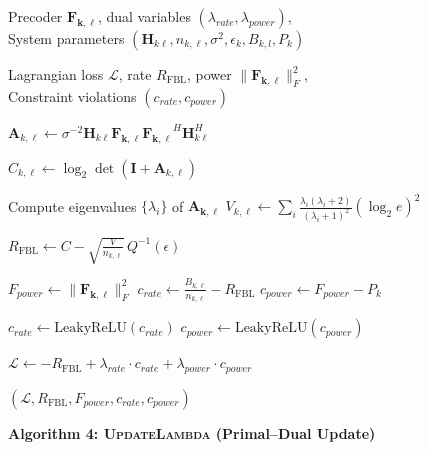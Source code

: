 \documentclass[a4paper, 12pt, onecolumn, journal, twoside, draftclsnofoot]{IEEEtran}
\begin{document}
\begin{algorithmic}[1]

\Require
Precoder $\mathbf{F_{k,\ell}}$, dual variables $(\lambda_{rate}, \lambda_{power})$, \\
System parameters $(\mathbf{H}_{k\ell}, n_{k,\ell}, \sigma^2, \epsilon_k, B_{k,l}, P_k)$

\Ensure
Lagrangian loss $\mathcal{L}$, rate $R_{\mathrm{FBL}}$, power $\|\mathbf{F_{k,\ell}}\|_F^2$, \\
Constraint violations $(c_{rate}, c_{power})$

\State $\mathbf{A}_{k,\ell} \gets \sigma^{-2} \mathbf{H}_{k\ell} \mathbf{F_{k,\ell}} \mathbf{F_{k,\ell}}^H \mathbf{H}_{k\ell}^H$

\Statex {}
\State $C_{k,\ell} \gets \log_2 \det(\mathbf{I} + \mathbf{A}_{k,\ell})$

\Statex {}
\State Compute eigenvalues $\{\lambda_i\}$ of $\mathbf{A_{k,\ell}}$
\State $V_{k,\ell} \gets \sum_i \frac{\lambda_i(\lambda_i + 2)}{(\lambda_i + 1)^2} (\log_2 e)^2$

\Statex {}
\State $R_{\mathrm{FBL}} \gets C - \sqrt{\frac{V}{n_{k,\ell}}} \, Q^{-1}(\epsilon)$

\Statex {}
\State $F_{power} \gets \|\mathbf{F_{k,\ell}}\|_F^2$
\State $c_{rate} \gets \frac{B_{k,\ell}}{n_{k,\ell}} - R_{\mathrm{FBL}}$
\State $c_{power} \gets F_{power} - P_{k}$

\Statex {}
\Statex {}

\State $c_{rate} \gets \mathrm{LeakyReLU}(c_{rate})$
\State $c_{power} \gets \mathrm{LeakyReLU}(c_{power})$

\Statex {}
\State $\mathcal{L} \gets -R_{\mathrm{FBL}}
+ \lambda_{rate} \cdot c_{rate}
+ \lambda_{power} \cdot c_{power}$

\State \Return $(\mathcal{L}, R_{\mathrm{FBL}}, F_{power}, c_{rate}, c_{power})$

\end{algorithmic}

\newpage
\noindent\textbf{Algorithm 4: \textsc{UpdateLambda} (Primal--Dual Update)}
\end{document}
